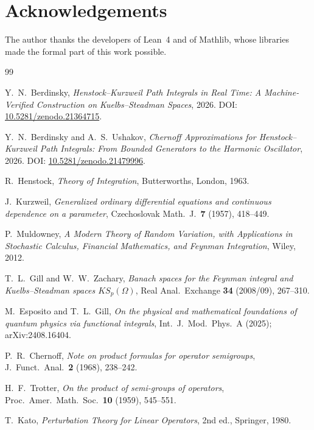 \documentclass[11pt,a4paper]{article}
\theoremstyle{plain}
\theoremstyle{definition}
\theoremstyle{remark}
\begin{document}
\section*{Acknowledgements}
The author thanks the developers of Lean~4 and of Mathlib, whose libraries made the
formal part of this work possible.

\begin{thebibliography}{99}

Y.~N.~Berdinsky,
\emph{Henstock--Kurzweil Path Integrals in Real Time: A Machine-Verified Construction on
Kuelbs--Steadman Spaces}, 2026.
DOI: \href{https://doi.org/10.5281/zenodo.21364715}{10.5281/zenodo.21364715}.

Y.~N.~Berdinsky and A.~S.~Ushakov,
\emph{Chernoff Approximations for Henstock--Kurzweil Path Integrals: From Bounded
Generators to the Harmonic Oscillator}, 2026.
DOI: \href{https://doi.org/10.5281/zenodo.21479996}{10.5281/zenodo.21479996}.

R.~Henstock, \emph{Theory of Integration}, Butterworths, London, 1963.

J.~Kurzweil, \emph{Generalized ordinary differential equations and continuous dependence
on a parameter}, Czechoslovak Math.\ J.\ \textbf{7} (1957), 418--449.

P.~Muldowney, \emph{A Modern Theory of Random Variation, with Applications in Stochastic
Calculus, Financial Mathematics, and Feynman Integration}, Wiley, 2012.

T.~L.~Gill and W.~W.~Zachary, \emph{Banach spaces for the Feynman integral and
Kuelbs--Steadman spaces $KS_p(\Omega)$}, Real Anal.\ Exchange \textbf{34} (2008/09),
267--310.

M.~Esposito and T.~L.~Gill, \emph{On the physical and mathematical foundations of quantum
physics via functional integrals}, Int.\ J.\ Mod.\ Phys.\ A (2025);
arXiv:2408.16404.

P.~R.~Chernoff, \emph{Note on product formulas for operator semigroups}, J.\ Funct.\
Anal.\ \textbf{2} (1968), 238--242.

H.~F.~Trotter, \emph{On the product of semi-groups of operators}, Proc.\ Amer.\ Math.\
Soc.\ \textbf{10} (1959), 545--551.

T.~Kato, \emph{Perturbation Theory for Linear Operators}, 2nd ed., Springer, 1980.


\end{thebibliography}
\end{document}
